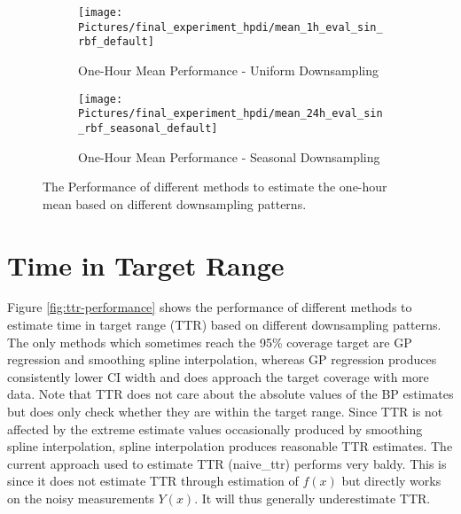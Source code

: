 \begin{figure}[!ht]
\centering
\begin{subfigure}{\textwidth}
    \centering
    \texttt{[image: Pictures/final\_experiment\_hpdi/mean\_1h\_eval\_sin\_rbf\_default]}
    \caption{One-Hour Mean Performance - Uniform Downsampling}
    \label{fig:hourly-mean-uniform-sampling-performance}
\end{subfigure}

\bigskip

\begin{subfigure}{\textwidth}
    \centering
    \texttt{[image: Pictures/final\_experiment\_hpdi/mean\_24h\_eval\_sin\_rbf\_seasonal\_default]}
    \caption{One-Hour Mean Performance - Seasonal Downsampling}
    \label{fig:hourly-mean-seasonal-sampling-performance}
\end{subfigure}
\caption[One-Hour Mean Performance]{The Performance of different methods to
estimate the one-hour mean based on different downsampling patterns.
}
\label{fig:hourly-mean-performance}
\end{figure}


\section{Time in Target Range}

Figure \ref{fig:ttr-performance} shows the performance of different methods to
estimate time in target range (TTR) based on different downsampling patterns.
The only methods which sometimes reach the 95\% coverage target are
GP regression and smoothing spline interpolation, whereas GP regression produces
consistently lower CI width and does approach the target coverage with more
data.
Note that TTR does not care about the absolute values of the BP estimates
but does only check whether they are within the target range.
Since TTR is not affected by the extreme estimate values
occasionally produced by smoothing spline interpolation,
spline interpolation produces reasonable TTR estimates.
The current approach used to estimate TTR (naive_ttr) performs very baldy.
This is since it does not estimate TTR through estimation of $f(x)$ but directly
works on the noisy measurements $Y(x)$. It will thus generally underestimate
TTR.


